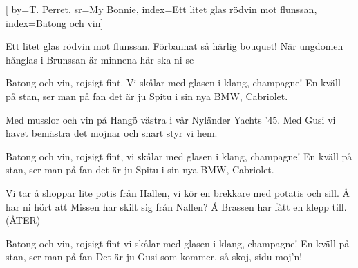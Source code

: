


[ 		%
	by={T. Perret},					%
	sr={My Bonnie},					%
	index={Ett litet glas rödvin mot flunssan}, %
	index={Batong och vin}]						%
	
\beginverse*						%
Ett litet glas rödvin mot flunssan. 
Förbannat så härlig bouquet!
När ungdomen hånglas i Brunssan 
är minnena här ska ni se
\endverse							%

\beginchorus						%
Batong och vin,
rojsigt fint.
Vi skålar med glasen i klang,
champagne!
En kväll på stan, ser man på fan
det är ju Spitu i sin nya BMW, Cabriolet.
\endchorus							%

\beginverse*						%
Med musslor och vin på Hangö västra
i vår Nyländer Yachts ’45.
Med Gusi vi havet bemästra
det mojnar och snart styr vi hem.
\endverse							%

\beginchorus						%
Batong och vin,
rojsigt fint,
vi skålar med glasen i klang,
champagne!
En kväll på stan, ser man på fan
det är ju Spitu i sin nya BMW, Cabriolet.
\endchorus							%

\beginverse*						%
Vi tar å shoppar lite potis från Hallen,
vi kör en brekkare med potatis och sill.
Å har ni hört att Missen har skilt sig
från Nallen?
Å Brassen har fått en klepp till. (ÅTER)
\endverse							%

\beginchorus						%
Batong och vin, rojsigt fint
vi skålar med glasen i klang,
champagne!
En kväll på stan, ser man på fan
Det är ju Gusi som kommer, så skoj,
sidu moj'n!
\endchorus							%
\endsong							%